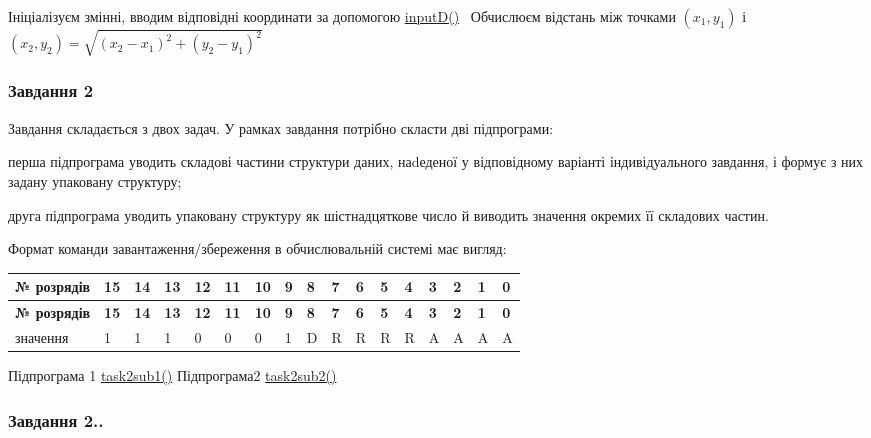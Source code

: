 Ініціалізуєм змінні, вводим відповідні координати за допомогою \hyperlink{main_8c_aa9f623385e5c1c8ac44a985d44cf3c5a}{input\+D()}~\newline
Обчислюєм відстань між точками $(x_1,y_1)$ і $(x_2,y_2) = \sqrt{(x_2-x_1)^2+(y_2-y_1)^2}$ \subsubsection*{Завдання 2}

Завдання складається з двох задач. У рамках завдання потрібно скласти дві підпрограми\+:
\begin{DoxyItemize}
\item перша підпрограма уводить складові частини структури даних, наdеденої у відповідному варіанті індивідуального завдання, і формує з них задану упаковану структуру;
\item друга підпрограма уводить упаковану структуру як шістнадцяткове число й виводить значення окремих її складових частин.
\end{DoxyItemize}

Формат команди завантаження/збереження в обчислювальній системі має вигляд\+: \tabulinesep=1mm
\begin{longtabu} spread 0pt [c]{*{17}{|X[-1]}|}
\hline
\rowcolor{\tableheadbgcolor}\textbf{ № розрядів }&\textbf{ 15 }&\textbf{ 14 }&\textbf{ 13 }&\textbf{ 12 }&\textbf{ 11 }&\textbf{ 10 }&\textbf{ 9 }&\textbf{ 8 }&\textbf{ 7 }&\textbf{ 6 }&\textbf{ 5 }&\textbf{ 4 }&\textbf{ 3 }&\textbf{ 2 }&\textbf{ 1 }&\textbf{ 0  }\\
\endfirsthead
\hline
\endfoot
\hline
\rowcolor{\tableheadbgcolor}\textbf{ № розрядів }&\textbf{ 15 }&\textbf{ 14 }&\textbf{ 13 }&\textbf{ 12 }&\textbf{ 11 }&\textbf{ 10 }&\textbf{ 9 }&\textbf{ 8 }&\textbf{ 7 }&\textbf{ 6 }&\textbf{ 5 }&\textbf{ 4 }&\textbf{ 3 }&\textbf{ 2 }&\textbf{ 1 }&\textbf{ 0  }\\
\endhead
значення &1 &1 &1 &0 &0 &0 &1 &D &R &R &R &R &A &A &A &A \\
\end{longtabu}
Підпрограма 1 \hyperlink{main_8c_a49562a6161d394ce5f96b6731e07e440}{task2sub1()} Підпрограма2 \hyperlink{main_8c_a08a44a4f43367b221db5d4e7b2657623}{task2sub2()}~\newline
\subsubsection*{Завдання 2..}

